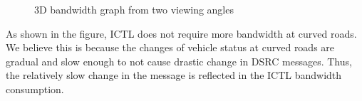 \documentclass[12pt]{report}
\begin{document}
\begin{figure}[h]
  \caption{\label{fig:3d}3D bandwidth graph from two viewing angles}
\end{figure}

As shown in the figure, ICTL does not require more bandwidth at curved roads. We believe this is because the changes of vehicle status at curved roads are gradual and slow enough to not cause drastic change in DSRC messages. Thus, the relatively slow change in the message is reflected in the ICTL bandwidth consumption.
\end{document}
